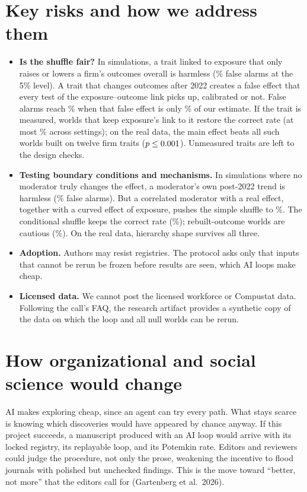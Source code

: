 \documentclass[11pt]{article}
\begin{document}
\section*{Key risks and how we address them}
\begin{itemize}
\item \textbf{Is the shuffle fair?} In simulations, a trait linked to exposure that only raises or lowers a firm's outcomes
overall is harmless (\VExLevel\% false alarms at the 5\% level). A trait that changes outcomes after 2022 creates a false
effect that every test of the exposure--outcome link picks up, calibrated or not. False alarms reach \VExNWCFourFive\% when
that false effect is only \VExSpurFourFive\% of our estimate. If the trait is measured, worlds that keep exposure's link
to it restore the correct rate (at most \VExCovMax\% across \VExNcells settings); on the real data, the main effect beats
all \VBcovA such worlds built on twelve firm traits ($p\le0.001$). Unmeasured traits are left to the design checks.
\item \textbf{Testing boundary conditions and mechanisms.} In simulations where no moderator truly changes the effect, a
moderator's own post-2022 trend is harmless (\VMmPermFixTrend\% false alarms). But a correlated moderator with a real
effect, together with a curved effect of exposure, pushes the simple shuffle to \VMmPermFixAll\%. The conditional shuffle
keeps the correct rate (\VMmResFixAll\%); rebuilt-outcome worlds are cautious (\VMmFLFixAll\%). On the real data,
hierarchy shape survives all three.
\item \textbf{Adoption.} Authors may resist registries. The protocol asks only that inputs that cannot be rerun be frozen
before results are seen, which AI loops make cheap.
\item \textbf{Licensed data.} We cannot post the licensed workforce or Compustat data. Following the call's FAQ, the
research artifact provides a synthetic copy of the data on which the loop and all null worlds can be rerun.
\end{itemize}

\section*{How organizational and social science would change}
AI makes exploring cheap, since an agent can try every path. What stays scarce is knowing which discoveries would have appeared
by chance anyway. If this project succeeds, a manuscript produced with an AI loop would arrive with its locked registry,
its replayable loop, and its Potemkin rate. Editors and reviewers could judge the procedure, not only the prose, weakening the
incentive to flood journals with polished but unchecked findings. This is the move toward ``better, not more'' that
the editors call for (Gartenberg et al.\ 2026).
\end{document}
